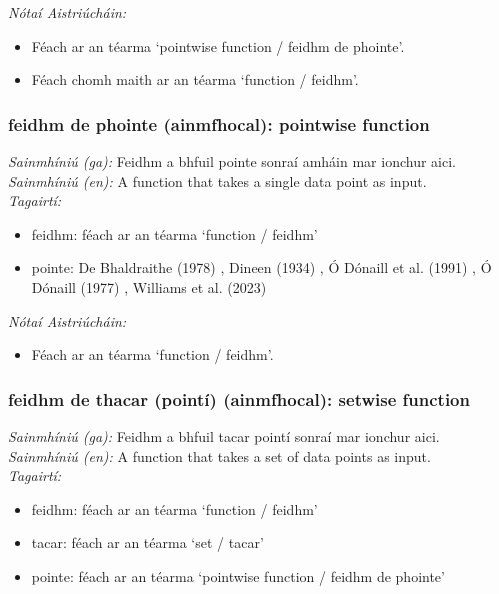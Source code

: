  \noindent \textit{Nótaí Aistriúcháin:}
\begin{itemize}
	\item Féach ar an téarma `pointwise function / feidhm de phointe'.
	\item Féach chomh maith ar an téarma `function / feidhm'.
\end{itemize}


\subsubsection*{feidhm de phointe (ainmfhocal): pointwise function}
 \noindent \textit{Sainmhíniú (ga):} Feidhm a bhfuil pointe sonraí amháin mar ionchur aici.
\\
 \noindent \textit{Sainmhíniú (en):} A function that takes a single data point as input.
\\
 \noindent \textit{Tagairtí:}
\begin{itemize}
	\item feidhm: féach ar an téarma `function / feidhm'
	\item pointe: De Bhaldraithe (1978) \cite{de-bhaldraithe}, Dineen (1934) \cite{dineen}, Ó Dónaill et al. (1991) \cite{focloir-beag}, Ó Dónaill (1977) \cite{odonaill}, Williams et al. (2023) \cite{storchiste}
\end{itemize}

 \noindent \textit{Nótaí Aistriúcháin:}
\begin{itemize}
	\item Féach ar an téarma `function / feidhm'.
\end{itemize}


\subsubsection*{feidhm de thacar (pointí) (ainmfhocal): setwise function}
 \noindent \textit{Sainmhíniú (ga):} Feidhm a bhfuil tacar pointí sonraí mar ionchur aici.
\\
 \noindent \textit{Sainmhíniú (en):} A function that takes a set of data points as input.
\\
 \noindent \textit{Tagairtí:}
\begin{itemize}
	\item feidhm: féach ar an téarma `function / feidhm'
	\item tacar: féach ar an téarma `set / tacar'
	\item pointe: féach ar an téarma `pointwise function / feidhm de phointe'
\end{itemize}

